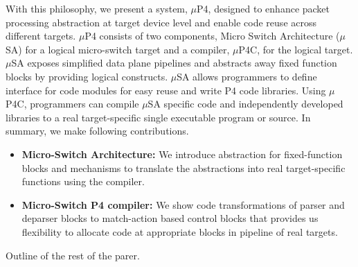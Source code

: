 With this philosophy, we present a system, $\mu$P4, designed to enhance packet processing abstraction at target device level and enable code reuse across different targets.
$\mu$P4 consists of two components, Micro Switch Architecture ($\mu$SA) for a logical micro-switch target and a compiler, $\mu$P4C, for the logical target. 
$\mu$SA exposes simplified data plane pipelines and abstracts away fixed function blocks by providing logical constructs.
$\mu$SA allows programmers to define interface for code modules for easy reuse and write P4 code libraries.
Using $\mu$P4C, programmers can compile $\mu$SA specific code and independently developed libraries to a real target-specific single executable program or source.
In summary, we make following contributions.
\begin{itemize}
\item \textbf{Micro-Switch Architecture:} We introduce abstraction for fixed-function blocks and mechanisms to translate the abstractions into real target-specific functions using the compiler.
\item \textbf{Micro-Switch P4 compiler:} We show code transformations of parser and deparser blocks to match-action based control blocks that provides us flexibility to allocate code at appropriate blocks in pipeline of real targets.
\end{itemize}

Outline of the rest of the parer. 
